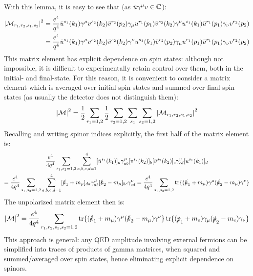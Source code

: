 With this lemma, it is easy to see that (as $ \bar{u} \gamma^\mu v \in \mathbb{C} $):
\begin{equation*}
  \begin{split}
    \left\lvert\mathcal{M}_{r_1,r_2,s_1,s_2}\right\rvert^2
    & = \frac{e^4}{q^4} \bar{u}^{s_1}(k_1) \gamma^\mu v^{s_2}(k_2) \bar{v}^{r_2}(p_2) \gamma_\mu u^{r_1}(p_1) \bar{v}^{s_2}(k_2) \gamma^\nu u^{s_1}(k_1) \bar{u}^{r_1}(p_1) \gamma_\nu v^{r_2}(p_2) \\
    & = \frac{e^4}{q^4} \bar{u}^{s_1}(k_1) \gamma^\mu v^{s_2}(k_2) \bar{v}^{s_2}(k_2) \gamma^\nu u^{s_1}(k_1) \bar{v}^{r_2}(p_2) \gamma_\mu u^{r_1}(p_1) \bar{u}^{r_1}(p_1) \gamma_\nu v^{r_2}(p_2)
  \end{split}
\end{equation*}
This matrix element has explicit dependence on spin states: although not impossible, it is difficult to experimentally retain control over them, both in the initial- and final-state. For this reason, it is convenient to consider a matrix element which is averaged over initial spin states and summed over final spin states (as usually the detector does not distinguish them):
\begin{equation}
  \left\lvert\mathcal{M}\right\rvert^2 = \frac{1}{2} \sum_{r_1 = 1,2} \frac{1}{2} \sum_{r_2 = 1,2} \sum_{s_1} \sum_{s_2 = 1,2} \left\lvert\mathcal{M}_{r_1,r_2,s_1,s_2}\right\rvert^2
\end{equation}
Recalling  and writing spinor indices explicitly, the first half of the matrix element is:
\begin{multline*}
  \frac{e^4}{4q^4} \sum_{s_1,s_2 = 1,2} \sum_{a,b,c,d = 1}^{4} [\bar{u}^{s_1}(k_1)]_a \gamma^\mu_{ab} [v^{s_2}(k_2)]_b [\bar{v}^{s_2}(k_2)]_c \gamma^\nu_{cd} [u^{s_1}(k_1)]_d \\
  = \frac{e^4}{4q^4} \sum_{s_1,s_2 = 1,2} \sum_{a,b,c,d = 1}^{4} [\slashed{k}_1 + m_\mu]_{da} \gamma^\mu_{ab} [\slashed{k}_2 - m_\mu]_{bc} \gamma^\nu_{cd} = \frac{e^4}{4q^4} \sum_{s_1,s_2 = 1,2} \operatorname{tr}\{(\slashed{k}_1 + m_\mu) \gamma^\mu (\slashed{k}_2 - m_\mu) \gamma^\nu\}
\end{multline*}
The unpolarized matrix element then is:
\begin{equation}
  \left\lvert\mathcal{M}\right\rvert^2 = \frac{e^4}{4q^4} \sum_{r_1,r_2,s_1,s_2 = 1,2} \operatorname{tr}\{(\slashed{k}_1 + m_\mu) \gamma^\mu (\slashed{k}_2 - m_\mu) \gamma^\nu\} \operatorname{tr}\{(\slashed{p}_1 + m_e) \gamma_\mu (\slashed{p}_2 - m_e) \gamma_\nu\}
  \label{eq:unp-mat-el-pre}
\end{equation}
This approach is general: any QED amplitude involving external fermions can be simplified into traces of products of gamma matrices, when squared and summed/averaged over spin states, hence eliminating explicit dependence on spinors.

